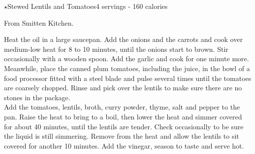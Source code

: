 \begin{recipe}{$\star$Stewed Lentils and Tomatoes}{4 servings - 160 calories}{}

\freeform From Smitten Kitchen.


Heat the oil in a large saucepan. Add the onions and the carrots and cook over medium-low heat for 8 to 10 minutes, until the onions start to brown. Stir occasionally with a wooden spoon. Add the garlic and cook for one minute more.\\

Meanwhile, place the canned plum tomatoes, including the juice, in the bowl of a food processor fitted with a steel blade and pulse several times until the tomatoes are coarsely chopped. Rinse and pick over the lentils to make sure there are no stones in the package.\\

Add the tomatoes, lentils, broth, curry powder, thyme, salt and pepper to the pan. Raise the heat to bring to a boil, then lower the heat and simmer covered for about 40 minutes, until the lentils are tender. Check occasionally to be sure the liquid is still simmering. Remove from the heat and allow the lentils to sit covered for another 10 minutes. Add the vinegar, season to taste and serve hot.

\end{recipe}